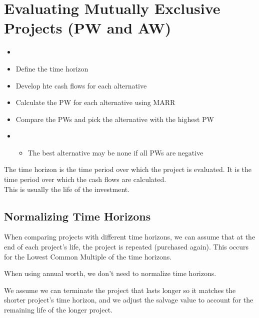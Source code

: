 \section{Evaluating Mutually Exclusive Projects (PW and AW)}

\begin{theorem}
    \begin{itemize}
        \item[]
        \item Define the time horizon
        \item Develop hte cash flows for each alternative
        \item Calculate the PW for each alternative using MARR
        \item Compare the PWs and pick the alternative with the highest PW
        \item[] \begin{itemize}
                  \item The best alternative may be none if all PWs are negative
              \end{itemize}
    \end{itemize}
\end{theorem}

\begin{definition}
    The time horizon is the time period over which the project is evaluated. It is the time period over which the cash flows are calculated.\\
    This is usually the life of the investment.
\end{definition}

\subsection{Normalizing Time Horizons}

\begin{theorem}
    When comparing projects with different time horizons, we can assume that at the end of each project's life, the project is repeated (purchased again). This occurs for the Lowest Common Multiple of the time horizons.
\end{theorem}
\begin{remark}
    When using annual worth, we don't need to normalize time horizons.
\end{remark}

\begin{theorem}
    We assume we can terminate the project that lasts longer so it matches the shorter project's time horizon, and we adjust the salvage value to account for the remaining life of the longer project.
\end{theorem}